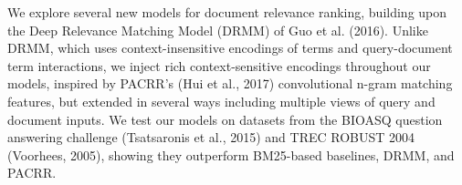 We explore several new models for document relevance ranking, building upon the Deep Relevance Matching Model (DRMM) of Guo et al. (2016). Unlike DRMM, which uses context-insensitive encodings of terms and query-document term interactions, we inject rich context-sensitive encodings throughout our models, inspired by PACRR's (Hui et al., 2017) convolutional n-gram matching features, but extended in several ways including multiple views of query and document inputs. We test our models on datasets from the BIOASQ question answering challenge (Tsatsaronis et al., 2015) and TREC ROBUST 2004 (Voorhees, 2005), showing they outperform BM25-based baselines, DRMM, and PACRR.
